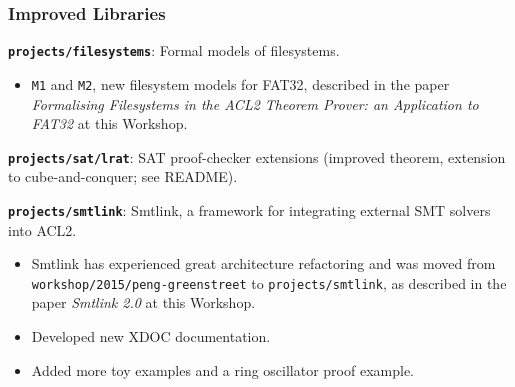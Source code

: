 \documentclass{beamer}
\newcommand{\code}[1]{\texttt{#1}}
\newcommand{\bookpath}[1]{\textbf{\code{#1}}}
\newcommand{\implibtitle}{\frametitle{Improved Libraries}}
\newcommand{\separation}{\vspace*{1ex}}
\begin{document}

\begin{frame}

\implibtitle

\bookpath{projects/filesystems}:
Formal models of filesystems.
\begin{itemize}
\item
\texttt{M1} and \texttt{M2}, new filesystem models for FAT32,
described in the paper
\textit{Formalising Filesystems in the ACL2 Theorem Prover:
an Application to FAT32}
at this Workshop.
\end{itemize}

\separation

\bookpath{projects/sat/lrat}:
SAT proof-checker extensions (improved theorem, extension to
cube-and-conquer; see README).

\separation

\bookpath{projects/smtlink}:
Smtlink, a framework for integrating external SMT solvers into ACL2.
\begin{itemize}
\item
Smtlink has experienced great architecture refactoring and was moved from
\code{workshop/2015/peng-greenstreet} to \code{projects/smtlink},
as described in the paper \textit{Smtlink 2.0} at this Workshop.
\item
Developed new XDOC documentation.
\item
Added more toy examples and a ring oscillator proof example.
\end{itemize}

\end{frame}

\end{document}
